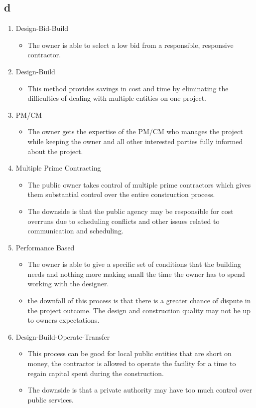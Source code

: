 \documentclass[12pt]{article} %
\begin{document}
	\subsection{d}
		\begin{enumerate}
			\item Design-Bid-Build
				\begin{itemize}
					\item The owner is able to select a low bid from a responsible, responsive contractor.
				\end{itemize}
			\item Design-Build
				\begin{itemize}
					\item This method provides savings in cost and time by eliminating the difficulties of dealing with multiple entities on one project.
				\end{itemize}
			\item PM/CM
				\begin{itemize}
					\item The owner gets the expertise of the PM/CM who manages the project while keeping the owner and all other interested parties fully informed about the project.
				\end{itemize}
			\item Multiple Prime Contracting
				\begin{itemize}
					\item The public owner takes control of multiple prime contractors which gives them substantial control over the entire construction process.
					\item The downside is that the public agency may be responsible for cost overruns due to scheduling conflicts and other issues related to communication and scheduling.
				\end{itemize}
			\item Performance Based
				\begin{itemize}
					\item The owner is able to give a specific set of conditions that the building needs and nothing more making small the time the owner has to spend working with the designer.
					\item the downfall of this process is that there is a greater chance of dispute in the project outcome. The design and construction quality may not be up to owners expectations.
				\end{itemize}
			\item Design-Build-Operate-Transfer
				\begin{itemize}
					\item This process can be good for local public entities that are short on money, the contractor is allowed to operate the facility for a time to regain capital spent during the construction.
					\item The downside is that a private authority may have too much control over public services.
				\end{itemize}
		\end{enumerate}
		
\end{document}
